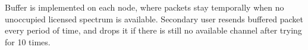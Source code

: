 





Buffer is implemented on each node, where packets stay temporally when no unoccupied licensed spectrum is available.
Secondary user resends buffered packet every period of time, and drops it if there is still no available channel after trying for 10 times.





